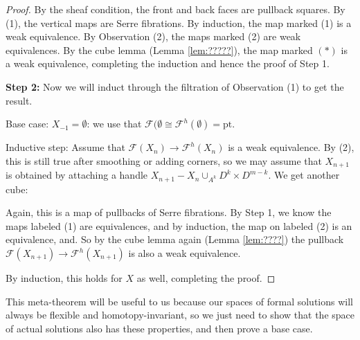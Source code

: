 \documentclass{article}
\newtheorem{proposed work}[theorem]{Proposed Work}
\begin{document}
\begin{proof}
By the sheaf condition, the front and back faces are pullback squares. By (1), the vertical maps are Serre fibrations. By induction, the map marked (1) is a weak equivalence. By Observation (2), the maps marked (2) are weak equivalences. By the cube lemma (Lemma \ref{lem:?????}), the map marked $(\ast)$ is a weak equivalence, completing the induction and hence the proof of Step 1.

\textbf{Step 2:} Now we will induct through the filtration of Observation (1) to get the result.

Base case: $X_{-1} = \emptyset$: we use that $\mathcal F(\emptyset \cong \mathcal F^h(\emptyset) = \mathrm{pt}$.

Inductive step: Assume that $\mathcal F(X_n) \to \mathcal F^h(X_n)$ is a weak equivalence. By (2), this is still true after smoothing or adding corners, so we may assume that $X_{n+1}$ is obtained by attaching a handle $X_{n+1} - X_n \cup_{A^k} D^k \times D^{m-k}$. We get another cube:



Again, this is a map of pullbacks of Serre fibrations.  By Step 1, we know the maps labeled (1) are equivalences, and by induction, the map on labeled (2) is an equivalence, and. So by the cube lemma again (Lemma \ref{lem:????}) the pullback $\mathcal F(X_{n+1}) \to \mathcal F^h(X_{n+1})$ is also a weak equivalence.

By induction, this holds for $X$ as well, completing the proof.
\end{proof}


This meta-theorem will be useful to us because our spaces of formal solutions will always be flexible and homotopy-invariant, so we just need to show that the space of actual solutions also has these properties, and then prove a base case.
\end{document}
